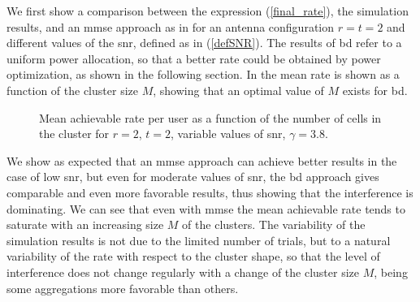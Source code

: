We first show a comparison between the expression (\ref{final_rate}), the simulation results, and an \gls{mmse} approach as in \cite{shi11} for an antenna configuration  $r=t=2$ and different values of the \gls{snr}, defined as in (\ref{defSNR}). The results of \gls{bd} refer to a uniform power allocation, so that a better rate could be obtained by power optimization, as shown in the following section. In  the mean rate is shown as a function of the cluster size $M$, showing that an optimal value of $M$ exists for \gls{bd}.
\begin{figure}[h]
\begin{center}
\begin{small}
\end{small}
\end{center}
\vspace*{-2.7mm}\caption{Mean achievable rate per user as a function of the number of
cells in the cluster for $r=2$, $t=2$, variable values of \gls{snr},
$\gamma=3.8$.}\label{rate2x2SNRa}
\end{figure}
We show as expected that an \gls{mmse} approach can achieve better results in the case of low \gls{snr}, but even for moderate values of \gls{snr}, the \gls{bd} approach gives comparable and even more favorable results, thus showing that the interference is dominating. We can see that even with \gls{mmse} the mean achievable rate tends to saturate with an increasing size $M$ of the clusters.
The variability of the simulation results is not due to the limited number of trials, but to a natural variability 
of the rate with respect to the cluster shape, so that the level of interference does not change regularly with a change of the cluster size $M$, being some aggregations more favorable than others. 

